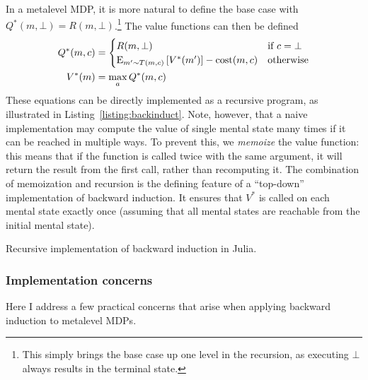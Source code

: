 In a metalevel MDP, it is more natural to define the base case with $Q^*(m, \bot) = R(m, \bot)$.\footnote{%
  This simply brings the base case up one level in the recursion, as executing $\bot$ always results in the terminal state.
} The value functions can then be defined
\begin{equation}\label{eq:value-recursive-meta}
\begin{aligned}
    Q^*(m, c) &= \begin{cases}
      R(m, \bot) &\text{if } c = \bot \\
      \expectunder{V^*(m')}{m' \sim T(m,c)} - \cost(m, c) &\text{otherwise}
    \end{cases} \\
    V^*(m) &= \max_a Q^*(m, c)
\end{aligned}
\end{equation}
These equations can be directly implemented as a recursive program, as illustrated in Listing~\ref{listing:backinduct}. Note, however, that a naive implementation may compute the value of single mental state many times if it can be reached in multiple ways. To prevent this, we \emph{memoize} the value function: this means that if the function is called twice with the same argument, it will return the result from the first call, rather than recomputing it. The combination of memoization and recursion is the defining feature of a ``top-down'' implementation of backward induction. It ensures that $V^*$ is called on each mental state exactly once (assuming that all mental states are reachable from the initial mental state).


\begin{listing}[tb!]
\caption{Recursive implementation of backward induction in Julia.}
\label{listing:backinduct}
\end{listing}

\subsubsection{Implementation concerns}

Here I address a few practical concerns that arise when applying backward induction to metalevel MDPs.

